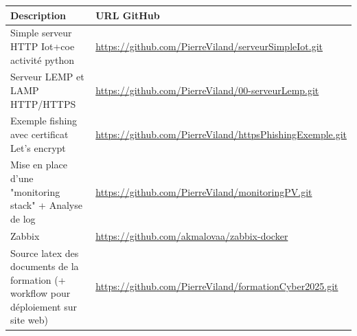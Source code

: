 \documentclass[french, 12pt]{article}%
\begin{document}
\footnotesize
\begin{tabular}{|>{\raggedright\arraybackslash}p{6cm}|>{\raggedright\arraybackslash}p{8cm}|}
\hline
\rowcolor{vert_capet} \textbf{Description} & \textbf{URL GitHub} \\
\hline
Simple serveur HTTP Iot+coe activité python& \url{https://github.com/PierreViland/serveurSimpleIot.git} \\


\hline
Serveur LEMP et LAMP HTTP/HTTPS& \url{https://github.com/PierreViland/00-serveurLemp.git} \\
\hline
Exemple fishing avec certificat Let's encrypt& \url{https://github.com/PierreViland/httpsPhishingExemple.git} \\
\hline
Mise en place d'une "monitoring stack" + Analyse de log & \url{https://github.com/PierreViland/monitoringPV.git} \\
\hline
Zabbix & \url{https://github.com/akmalovaa/zabbix-docker} \\
\hline
Source latex des documents de la formation (+ workflow pour déploiement sur site web) & \url{https://github.com/PierreViland/formationCyber2025.git} \\
\hline
\end{tabular}

\normalsize
\end{document}
